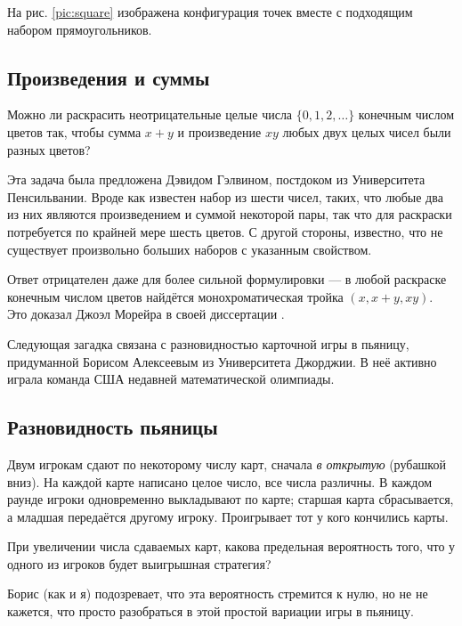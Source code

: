 На рис. \ref{pic:square} изображена конфигурация точек вместе с подходящим набором прямоугольников.

\subsection*{Произведения и суммы}

Можно ли раскрасить неотрицательные целые числа $\{0,1,2,\dots\}$ конечным числом цветов так, чтобы сумма $x+y$ и произведение $xy$ любых двух целых чисел были разных цветов?

\medskip

Эта задача была предложена Дэвидом Гэлвином, постдоком из Университета Пенсильвании.
Вроде как известен набор из шести чисел, таких, что любые два из них являются произведением и суммой некоторой пары, так что для раскраски потребуется по крайней мере шесть цветов.
С другой стороны, известно, что не существует произвольно больших наборов с указанным свойством.

\begin{addedbytheeditors}
Ответ отрицателен даже для более сильной формулировки --- в любой раскраске конечным числом цветов найдётся монохроматическая тройка $(x,x+y,xy)$.
Это доказал Джоэл Морейра в своей диссертации \cite{moreira}.
\pr
\end{addedbytheeditors}


\medskip

Следующая загадка связана с разновидностью карточной игры в пьяницу, придуманной Борисом Алексеевым из Университета Джорджии.
В неё активно играла команда США недавней математической олимпиады.

\subsection*{Разновидность пьяницы}

Двум игрокам сдают по некоторому числу карт, сначала \emph{в открытую} (рубашкой вниз).
На каждой карте написано целое число, все числа различны.
В каждом раунде игроки одновременно выкладывают по карте;
старшая карта сбрасывается, а младшая передаётся другому игроку.
Проигрывает тот у кого кончились карты.

При увеличении числа сдаваемых карт,
какова предельная вероятность того, что у одного из игроков будет выигрышная стратегия?

\medskip

Борис (как и я) подозревает, что эта вероятность стремится к нулю,
но не не кажется, что просто разобраться в этой простой вариации игры в пьяницу.

